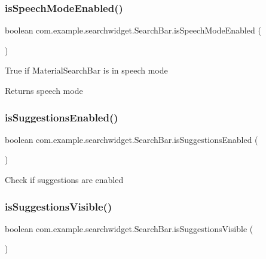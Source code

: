 \subsubsection{\texorpdfstring{isSpeechModeEnabled()}{isSpeechModeEnabled()}}
{\footnotesize\ttfamily boolean com.\+example.\+searchwidget.\+Search\+Bar.\+is\+Speech\+Mode\+Enabled (\begin{DoxyParamCaption}{ }\end{DoxyParamCaption})}

True if Material\+Search\+Bar is in speech mode

\begin{DoxyReturn}{Returns}
speech mode 
\end{DoxyReturn}
\mbox{\label{classcom_1_1example_1_1searchwidget_1_1_search_bar_afc87e89a8864899a626d2dcafb5db5b2}} 
\subsubsection{\texorpdfstring{isSuggestionsEnabled()}{isSuggestionsEnabled()}}
{\footnotesize\ttfamily boolean com.\+example.\+searchwidget.\+Search\+Bar.\+is\+Suggestions\+Enabled (\begin{DoxyParamCaption}{ }\end{DoxyParamCaption})}

Check if suggestions are enabled \mbox{\label{classcom_1_1example_1_1searchwidget_1_1_search_bar_aab6325bdf7997340d11ba29cbca66a34}} 
\subsubsection{\texorpdfstring{isSuggestionsVisible()}{isSuggestionsVisible()}}
{\footnotesize\ttfamily boolean com.\+example.\+searchwidget.\+Search\+Bar.\+is\+Suggestions\+Visible (\begin{DoxyParamCaption}{ }\end{DoxyParamCaption})}


